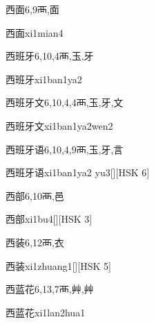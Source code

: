 \begin{Entry}{西面}{6,9}{⾑,⾯}
  \begin{Phonetics}{西面}{xi1mian4}
  \end{Phonetics}
\end{Entry}

\begin{Entry}{西班牙}{6,10,4}{⾑,⽟,⽛}
  \begin{Phonetics}{西班牙}{xi1ban1ya2}
  \end{Phonetics}
\end{Entry}

\begin{Entry}{西班牙文}{6,10,4,4}{⾑,⽟,⽛,⽂}
  \begin{Phonetics}{西班牙文}{xi1ban1ya2wen2}
  \end{Phonetics}
\end{Entry}

\begin{Entry}{西班牙语}{6,10,4,9}{⾑,⽟,⽛,⾔}
  \begin{Phonetics}{西班牙语}{xi1ban1ya2 yu3}[][HSK 6]
  \end{Phonetics}
\end{Entry}

\begin{Entry}{西部}{6,10}{⾑,⾢}
  \begin{Phonetics}{西部}{xi1bu4}[][HSK 3]
  \end{Phonetics}
\end{Entry}

\begin{Entry}{西装}{6,12}{⾑,⾐}
  \begin{Phonetics}{西装}{xi1zhuang1}[][HSK 5]
  \end{Phonetics}
\end{Entry}

\begin{Entry}{西蓝花}{6,13,7}{⾑,⾋,⾋}
  \begin{Phonetics}{西蓝花}{xi1lan2hua1}
  \end{Phonetics}
\end{Entry}

